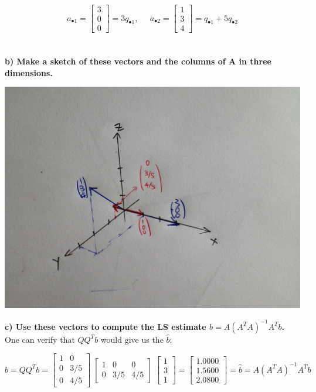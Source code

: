 \documentclass[paper=a4, fontsize=11pt]{scrartcl} %
\numberwithin{equation}{section} %
\numberwithin{figure}{section} %
\numberwithin{table}{section} %
\begin{document}
$$
a_{\bullet 1} = 
\begin{bmatrix}
3	\\
0	\\
0
\end{bmatrix}
= 3 q_{\bullet 1},
\;\;\;\;\;
a_{\bullet 2} = 
\begin{bmatrix}
1	\\
3	\\
4
\end{bmatrix}
= q_{\bullet 1} + 5 q_{\bullet 2}
$$\\\\

\textbf{b) Make a sketch of these vectors and the columns of A in three dimensions.}\\

\begin{center}
\includegraphics[scale=0.1]{sketch.JPG}\\
\end{center}

\textbf{c) Use these vectors to compute the LS estimate $\hat{b} = A(A^{T} A)^{-1} A^{T} b$.}\\ 

One can verify that $QQ^{T} b$ would give us the $\hat{b}$: 

$$
\hat{b} = 
QQ^{T} b = 
\begin{bmatrix}
1 & 0 \\
0 & 3/5 \\
0 & 4/5 
\end{bmatrix}
\;
\begin{bmatrix}
1 & 0  & 0\\
0 & 3/5  & 4/5 
\end{bmatrix}
\;
\begin{bmatrix}
1 \\
3 \\
1 
\end{bmatrix}
= 
\begin{bmatrix}
    1.0000	\\
    1.5600	\\
    2.0800
\end{bmatrix}
=
\hat{b} = A(A^{T} A)^{-1} A^{T} b
$$
\end{document}
